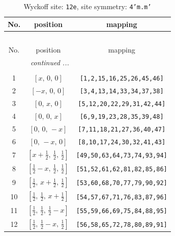 \documentclass[fleqn,8pt]{jsarticle}
\begin{document}
\begin{longtable}{ccc}
\caption{Wyckoff site: {\tt 12e}, site symmetry: {\tt 4'm.m'}}
 \\
 \hline \hline
No. & position & mapping \\ \hline \endfirsthead

\multicolumn{2}{l}{\tablename\ \thetable{}} \\
 \hline \hline
No. & position & mapping \\ \hline \endhead

 \hline \hline
\multicolumn{2}{r}{\footnotesize\it continued ...} \\ \endfoot

 \hline \hline
\multicolumn{2}{r}{} \\ \endlastfoot

1 & $\left[ x,\, 0,\, 0 \right]$ & {\tt [1,2,15,16,25,26,45,46]} \\ \hline
2 & $\left[ - x,\, 0,\, 0 \right]$ & {\tt [3,4,13,14,33,34,37,38]} \\ \hline
3 & $\left[ 0,\, x,\, 0 \right]$ & {\tt [5,12,20,22,29,31,42,44]} \\ \hline
4 & $\left[ 0,\, 0,\, x \right]$ & {\tt [6,9,19,23,28,35,39,48]} \\ \hline
5 & $\left[ 0,\, 0,\, - x \right]$ & {\tt [7,11,18,21,27,36,40,47]} \\ \hline
6 & $\left[ 0,\, - x,\, 0 \right]$ & {\tt [8,10,17,24,30,32,41,43]} \\ \hline
7 & $\left[ x + \frac{1}{2},\, \frac{1}{2},\, \frac{1}{2} \right]$ & {\tt [49,50,63,64,73,74,93,94]} \\ \hline
8 & $\left[ \frac{1}{2} - x,\, \frac{1}{2},\, \frac{1}{2} \right]$ & {\tt [51,52,61,62,81,82,85,86]} \\ \hline
9 & $\left[ \frac{1}{2},\, x + \frac{1}{2},\, \frac{1}{2} \right]$ & {\tt [53,60,68,70,77,79,90,92]} \\ \hline
10 & $\left[ \frac{1}{2},\, \frac{1}{2},\, x + \frac{1}{2} \right]$ & {\tt [54,57,67,71,76,83,87,96]} \\ \hline
11 & $\left[ \frac{1}{2},\, \frac{1}{2},\, \frac{1}{2} - x \right]$ & {\tt [55,59,66,69,75,84,88,95]} \\ \hline
12 & $\left[ \frac{1}{2},\, \frac{1}{2} - x,\, \frac{1}{2} \right]$ & {\tt [56,58,65,72,78,80,89,91]} \\
\end{longtable}
\renewcommand{\arraystretch}{1.2}
\end{document}
